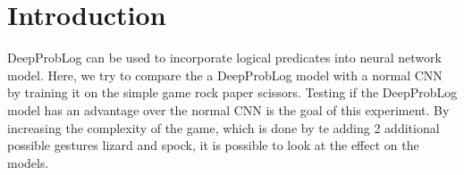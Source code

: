 \section{Introduction}
DeepProbLog \cite{DBLP} can be used to incorporate logical predicates into neural network model. Here, we try to compare the a DeepProbLog model with a normal CNN by training it on the simple game rock paper scissors. Testing if the DeepProbLog model has an advantage over the normal CNN is the goal of this experiment. By increasing the complexity of the game, which is done by te adding 2 additional possible gestures lizard and spock, it is possible to look at the effect on the models.

